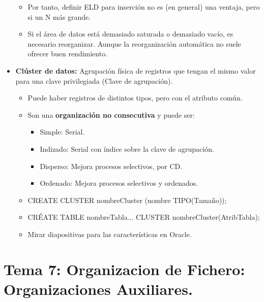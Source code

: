 \documentclass[12pt, twoside, openright]{report} %
\begin{document}
\begin{itemize}
\begin{itemize}
      \item Por tanto, definir ELD para inserción no es (en general) una
        ventaja, pero si un N más grande.
        
      \item Si el área de datos está demasiado saturada o demasiado vacío,
        es necesario reorganizar. Aunque la reorganización automática no
        suele ofrecer buen rendimiento.
        
      \end{itemize}
    \item \textbf{Clúster de datos:} Agrupación física de registros que
      tengan el mismo valor para una clave privilegiada (Clave de
      agrupación).
      

      \begin{itemize}
      \item Puede haber registros de distintos tipos, pero con el atributo
        común.
        
      \item Son una \textbf{organización no consecutiva} y puede ser:
        

        \begin{itemize}
        \item Simple: Serial.
          
        \item Indizado: Serial con índice sobre la clave de agrupación.
          
        \item Disperso: Mejora procesos selectivos, por CD.
          
        \item Ordenado: Mejora procesos selectivos y ordenados.
          
        \end{itemize}
      \item CREATE CLUSTER nombreCluster (nombre TIPO(Tamaño));
        
      \item CRÉATE TABLE nombreTabla... CLUSTER nombreCluster(AtribTabla);
        
      \item Mirar diapositivas para las características en Oracle.
        
      \end{itemize}
    \end{itemize}

  
\chapter{Tema 7: Organizacion de Fichero: Organizaciones Auxiliares.}
\end{document}
